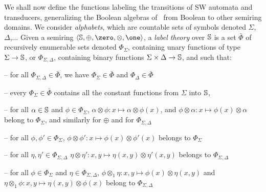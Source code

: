 %
%
We shall now define the functions labeling the transitions of SW automata and transducers,
generalizing the Boolean algebras of~\cite{dAntoniVeanes17CAV} 
from Boolean to other semiring domains.
%
We consider \emph{alphabets}, which are countable sets of symbols 
denoted $\Sigma$, $\Delta$,...
%
\noindent 
{}
Given a semiring $\< \Semiring, \oplus, \zero, \otimes, \one>$, 
a \emph{label theory} over $\mathbb{S}$
is a set $\bar\Phi$ of recursively enumerable sets denoted
$\Phi_\Sigma$, %
containing unary functions of type $\Sigma \to \mathbb{S}$, %
or $\Phi_{\Sigma, \Delta}$, containing binary functions $\Sigma \times \Delta \to \mathbb{S}$, 
and such that:

\noindent -- 
for all $\Phi_{\Sigma, \Delta} \in \bar\Phi$, we have
$\Phi_{\Sigma} \in \bar\Phi$ and $\Phi_{\Delta} \in \bar\Phi$

\noindent -- 
every $\Phi_{\Sigma}\in \bar\Phi$ contains all the constant functions from $\Sigma$ into $\mathbb{S}$, 
 
\noindent -- 
for all $\alpha \in \mathbb{S}$ and $\phi \in \Phi_\Sigma$,
      $\alpha \otimes \phi : x \mapsto \alpha \otimes \phi(x)$, 
      and $\phi \otimes \alpha : x \mapsto \phi(x) \otimes \alpha$\\
\phantom{--} belong to $\Phi_\Sigma$, and similarly for $\oplus$ 
      and for $\Phi_{\Sigma, \Delta}$

\noindent -- 
for all $\phi, \phi' \in \Phi_\Sigma$,
$\phi \otimes \phi': x \mapsto \phi(x) \otimes \phi'(x)$ belongs to $\Phi_\Sigma$

\noindent -- 
for all $\eta, \eta' \in \Phi_{\Sigma, \Delta}$
$\eta \otimes \eta': x, y \mapsto \eta(x, y) \otimes \eta'(x, y)$ belongs to $\Phi_{\Sigma, \Delta}$

\noindent -- 
for all $\phi \in \Phi_\Sigma$ and $\eta \in \Phi_{\Sigma, \Delta}$,
$\phi \otimes_1 \eta: x, y \mapsto \phi(x) \otimes \eta(x, y)$ and\\
\phantom{--} $\eta \otimes_1 \phi: x, y \mapsto \eta(x, y) \otimes \phi(x)$
belong to $\Phi_{\Sigma, \Delta}$

